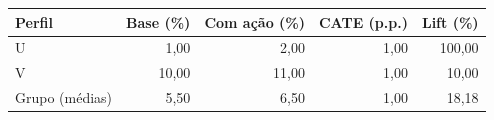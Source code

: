 \begin{tabular}{lrrrr}
\toprule
Perfil & Base (\%) & Com ação (\%) & CATE (p.p.) & Lift (\%) \\
\midrule
U & 1,00 & 2,00 & 1,00 & 100,00 \\
V & 10,00 & 11,00 & 1,00 & 10,00 \\
Grupo (médias) & 5,50 & 6,50 & 1,00 & 18,18 \\
\bottomrule
\end{tabular}

